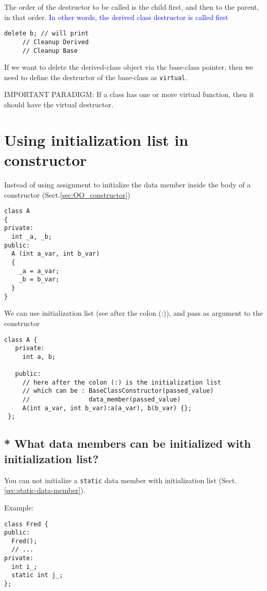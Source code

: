 The order of the destructor to be called is the child first, and then to the
parent, in that order. \textcolor{blue}{In other words, the derived class
destructor is called first}
\begin{verbatim}
delete b; // will print 
     // Cleanup Derived
     // Cleanup Base
\end{verbatim}

\begin{framed}
If we want to delete the derived-class object via the base-class pointer, then
we need to define the destructor of the base-class as \verb!virtual!.

IMPORTANT PARADIGM: If a class has one or more virtual function, then it should
have the virtual destructor.
\end{framed}

\section{Using initialization list in constructor}
\label{sec:initialization_list}

Instead of using assignment to initialize the data member
inside the body of a constructor (Sect.\ref{sec:OO_constructor})
\begin{verbatim}
class A
{
private:
  int _a, _b;
public:
  A (int a_var, int b_var)
  {
    _a = a_var;
    _b = b_var;
  }
}
\end{verbatim}

We can use initialization list (see after the colon (:)), and pass as argument
to the constructor

\begin{verbatim}
class A {
   private:
     int a, b;

   public:
     // here after the colon (:) is the initialization list
     // which can be : BaseClassConstructor(passed_value)
     //                data_member(passed_value)
     A(int a_var, int b_var):a(a_var), b(b_var) {}; 
 };
\end{verbatim}

\subsection{ * What data members can be initialized with initialization list?}

You can not initialize a \verb!static! data member with initialization list
(Sect.\ref{sec:static-data-member}).

Example:
\begin{verbatim}
class Fred {
public:
  Fred();
  // ...
private:
  int i_;
  static int j_;
};
\end{verbatim}

